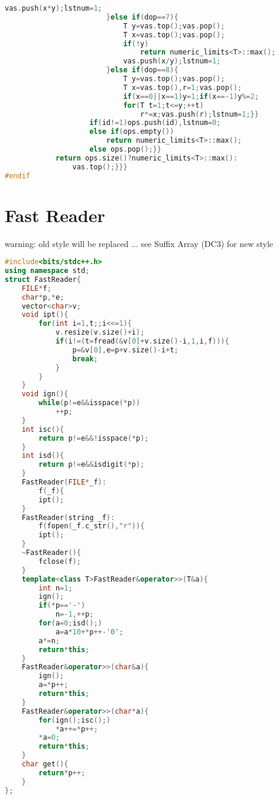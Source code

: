 \documentclass{book}
\begin{document}
\begin{lstlisting}[language=C++,title={Expression Evaluation.hpp (3275 bytes, 69 lines)}]
                            vas.push(x*y);lstnum=1;
                        }else if(dop==7){
                            T y=vas.top();vas.pop();
                            T x=vas.top();vas.pop();
                            if(!y)
                                return numeric_limits<T>::max();
                            vas.push(x/y);lstnum=1;
                        }else if(dop==8){
                            T y=vas.top();vas.pop();
                            T x=vas.top(),r=1;vas.pop();
                            if(x==0||x==1)y=1;if(x==-1)y%=2;
                            for(T t=1;t<=y;++t)
                                r*=x;vas.push(r);lstnum=1;}}
                    if(id!=1)ops.push(id),lstnum=0;
                    else if(ops.empty())
                        return numeric_limits<T>::max();
                    else ops.pop();}}
            return ops.size()?numeric_limits<T>::max():
                vas.top();}}}
#endif\end{lstlisting}
\section{Fast Reader}
warning: old style will be replaced ... see Suffix Array (DC3) for new style\begin{lstlisting}[language=C++,title={Fast Reader.hpp (1251 bytes, 61 lines)}]
#include<bits/stdc++.h>
using namespace std;
struct FastReader{
    FILE*f;
    char*p,*e;
    vector<char>v;
    void ipt(){
        for(int i=1,t;;i<<=1){
            v.resize(v.size()+i);
            if(i!=(t=fread(&v[0]+v.size()-i,1,i,f))){
                p=&v[0],e=p+v.size()-i+t;
                break;
            }
        }
    }
    void ign(){
        while(p!=e&&isspace(*p))
            ++p;
    }
    int isc(){
        return p!=e&&!isspace(*p);
    }
    int isd(){
        return p!=e&&isdigit(*p);
    }
    FastReader(FILE*_f):
        f(_f){
        ipt();
    }
    FastReader(string _f):
        f(fopen(_f.c_str(),"r")){
        ipt();
    }
    ~FastReader(){
        fclose(f);
    }
    template<class T>FastReader&operator>>(T&a){
        int n=1;
        ign();
        if(*p=='-')
            n=-1,++p;
        for(a=0;isd();)
            a=a*10+*p++-'0';
        a*=n;
        return*this;
    }
    FastReader&operator>>(char&a){
        ign();
        a=*p++;
        return*this;
    }
    FastReader&operator>>(char*a){
        for(ign();isc();)
            *a++=*p++;
        *a=0;
        return*this;
    }
    char get(){
        return*p++;
    }
};
\end{lstlisting}
\end{document}

